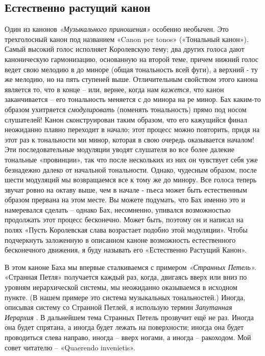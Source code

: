 \documentclass[../main.tex]{subfiles}
\begin{document}
\subsection{Естественно растущий канон}

Один из канонов \emph{«Музыкального приношения»} особенно необычен. Это трехголосный канон под названием «Canon per tonos» («Тональный канон»). Самый высокий голос исполняет Королевскую тему; два других голоса дают каноническую гармонизацию, основанную на второй теме, причем нижний голос ведет свою мелодию в до миноре (общая тональность всей фуги), а верхний - ту же мелодию, но на пять ступеней выше. Отличительным свойством этого канона является то, что в конце \--- или, вернее, когда нам \emph{кажется,} что канон заканчивается \--- его тональность меняется с до минора на ре минор. Бах каким-то образом ухитряется \emph{смодулировать} (поменять тональность) прямо под носом слушателей! Канон сконструирован таким образом, что его кажущийся финал неожиданно плавно переходит в начало; этот процесс можно повторить, придя на этот раз к тональности ми минор, которая в свою очередь оказывается началом! Эти последовательные модуляции уводят слушателя во все более далекие тональные «провинции», так что после нескольких из них он чувствует себя уже безнадежно далеко от начальной тональности. Однако, чудесным образом, после шести модуляций мы возвращаемся все к тому же до минору. Все голоса теперь звучат ровно на октаву выше, чем в начале - пьеса может быть естественным образом прервана на этом месте. Вы можете подумать, что Бах именно это и намеревался сделать \--- однако Бах, несомненно, упивался возможностью продолжать этот процесс бесконечно. Может быть, поэтому он и написал на полях «Пусть Королевская слава возрастает подобно этой модуляции». Чтобы подчеркнуть заложенную в описанном каноне возможность естественного бесконечного движения, я буду называть его «Естественно Растущий Канон».

В этом каноне Баха мы впервые сталкиваемся с примером \emph{«Странных Петель».} «Странная Петля» получается каждый раз, когда, двигаясь вверх или вниз по уровням иерархической системы, мы неожиданно оказываемся в исходном пункте. (В нашем примере это система музыкальных тональностей.) Иногда, описывая систему со Странной Петлей, я использую термин \emph{Запутанная Иерархия} . В дальнейшем тема Странных Петель прозвучит ещё не раз. Иногда она будет спрятана, а иногда будет лежать на поверхности; иногда она будет проводиться слева направо, иногда \--- вверх ногами, а иногда \--- ракоходом. Мой совет читателю \--- «Quaerendo invenietis».
\end{document}
